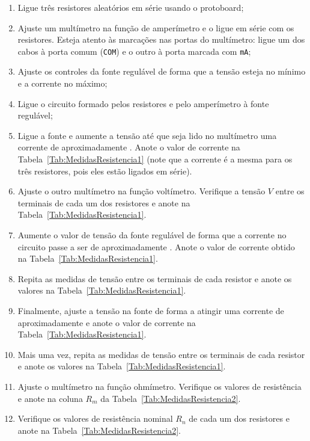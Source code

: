 \begin{enumerate}
    \item Ligue três resistores aleatórios em série usando o protoboard;
    \item Ajuste um multímetro na função de amperímetro e o ligue em série com os resistores. Esteja atento às marcações nas portas do multímetro: ligue um dos cabos à porta comum (\texttt{COM}) e o outro à porta marcada com \texttt{mA};
    \item Ajuste os controles da fonte regulável de forma que a tensão esteja no mínimo e a corrente no máximo;
    \item Ligue o circuito formado pelos resistores e pelo amperímetro à fonte regulável;
    \item Ligue a fonte e aumente a tensão até que seja lido no multímetro uma corrente de aproximadamente . Anote o valor de corrente na Tabela~\ref{Tab:MedidasResistencia1} (note que a corrente é a mesma para os três resistores, pois eles estão ligados em série).
    \item Ajuste o outro multímetro na função voltímetro. Verifique a tensão $V$ entre os terminais de cada um dos resistores e anote na Tabela~\ref{Tab:MedidasResistencia1}.
    \item Aumente o valor de tensão da fonte regulável de forma que  a corrente no circuito passe a ser de aproximadamente . Anote o valor de corrente obtido na Tabela~\ref{Tab:MedidasResistencia1}.
    \item Repita as medidas de tensão entre os terminais de cada resistor e anote os valores na Tabela~\ref{Tab:MedidasResistencia1}.
    \item Finalmente, ajuste a tensão na fonte de forma a atingir uma corrente de aproximadamente  e anote o valor de corrente na Tabela~\ref{Tab:MedidasResistencia1}.
    \item Mais uma vez, repita as medidas de tensão entre os terminais de cada resistor e anote os valores na Tabela~\ref{Tab:MedidasResistencia1}.
    \item Ajuste o multímetro na função ohmímetro. Verifique os valores de resistência e anote na coluna $R_m$ da Tabela~\ref{Tab:MedidasResistencia2}.
    \item Verifique os valores de resistência nominal $R_n$ de cada um dos resistores e anote na Tabela~\ref{Tab:MedidasResistencia2}.
\end{enumerate}

\cleardoublepage

